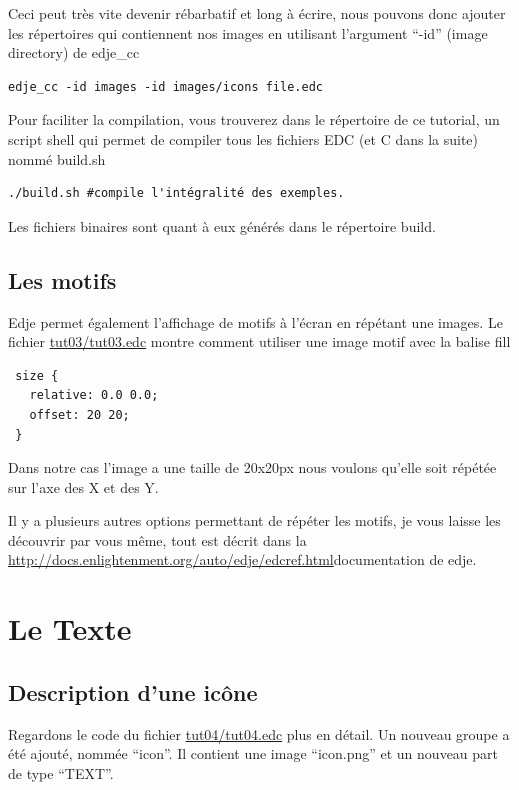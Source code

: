 \documentclass[a4paper]{efr}
\begin{document}
Ceci peut très vite devenir rébarbatif et long à écrire, nous pouvons donc
ajouter les répertoires qui contiennent nos images en utilisant l'argument
``-id'' (image directory) de edje\_cc

\begin{lstlisting}
edje_cc -id images -id images/icons file.edc
\end{lstlisting}

Pour faciliter la compilation, vous trouverez dans le répertoire de ce tutorial,
un script shell qui permet de compiler tous les fichiers EDC (et C dans la
suite) nommé build.sh

\begin{lstlisting}
./build.sh #compile l'intégralité des exemples.
\end{lstlisting}

Les fichiers binaires sont quant à eux générés dans le répertoire build.

\subsection{Les motifs}
Edje permet également l'affichage de motifs à l'écran en répétant une images.
Le fichier \href{file://tut03/tut03.edc}{tut03/tut03.edc} montre comment
utiliser une image motif avec la balise fill
\begin{lstlisting}
 size {
   relative: 0.0 0.0;
   offset: 20 20;
 }
\end{lstlisting}

Dans notre cas l'image a une taille de 20x20px nous voulons qu'elle soit répétée
sur l'axe des X et des Y.

Il y a plusieurs autres options permettant de répéter les motifs, je vous laisse
les découvrir par vous même, tout est décrit dans la
\url{http://docs.enlightenment.org/auto/edje/edcref.html}{documentation de edje}.


\section{Le Texte}

\subsection{Description d'une icône}
Regardons le code du fichier \href{file://tut04/tut04.edc}{tut04/tut04.edc} plus
en détail. Un nouveau groupe a été ajouté, nommée ``icon''. Il contient une
image ``icon.png'' et un nouveau part de type ``TEXT''.
\end{document}
